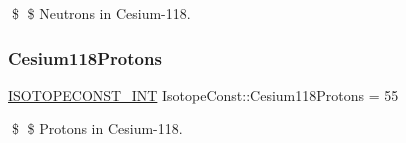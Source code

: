 \$ \$ Neutrons in Cesium-\/118. \mbox{\label{group___isotope_const-_cesium-_cs118_gae2f4443d69d670dbdb8da25d2351fd25}} 
\subsubsection{\texorpdfstring{Cesium118\+Protons}{Cesium118Protons}}
{\footnotesize\ttfamily \mbox{\hyperlink{group___isotope_const-_macros_ga5f18360b3e99483a35c32d789e62621c}{I\+S\+O\+T\+O\+P\+E\+C\+O\+N\+S\+T\+\_\+\+I\+NT}} Isotope\+Const\+::\+Cesium118\+Protons = 55}

\$ \$ Protons in Cesium-\/118. 